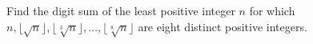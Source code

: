Find the digit sum of the least positive integer $n$ for which $n,\lfloor\sqrt n\rfloor,\lfloor\sqrt[3]n\rfloor,\ldots,\lfloor\sqrt[8]n\rfloor$ are eight distinct positive integers.
